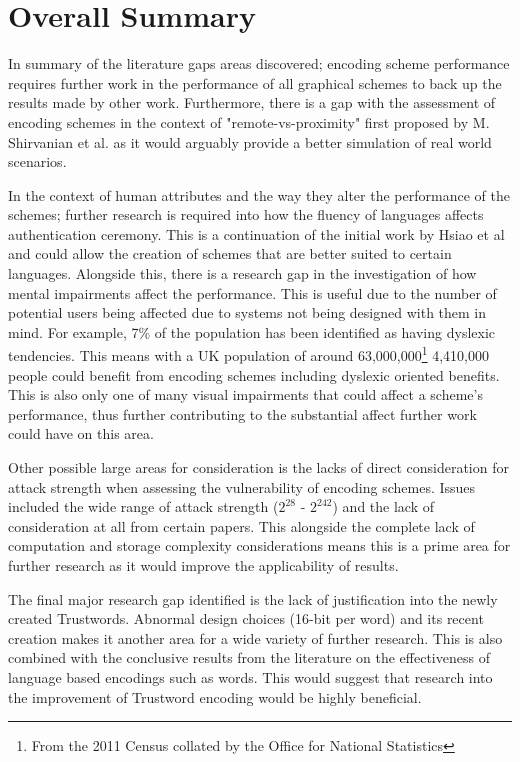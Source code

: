 \section{Overall Summary}
In summary of the literature gaps areas discovered; encoding scheme performance requires further work in the performance of all graphical schemes to back up the results made by other work. Furthermore, there is a gap with the assessment of encoding schemes in the context of "remote-vs-proximity" first proposed by M. Shirvanian et al. as it would arguably provide a better simulation of real world scenarios.

In the context of human attributes and the way they alter the performance of the schemes; further research is required into how the fluency of languages affects authentication ceremony. This is a continuation of the initial work by Hsiao et al and could allow the creation of schemes that are better suited to certain languages.
Alongside this, there is a research gap in the investigation of how mental impairments affect the performance. This is useful due to the number of potential users being affected due to systems not being designed with them in mind. For example, 7\% of the population has been identified as having dyslexic tendencies\cite{peterson2012developmental}. This means with a UK population of around 63,000,000\footnote{From the 2011 Census collated by the Office for National Statistics}  4,410,000 people could benefit from encoding schemes including dyslexic oriented benefits. This is also only one of many visual impairments that could affect a scheme's performance, thus further contributing to the substantial affect further work could have on this area.

Other possible large areas for consideration is the lacks of direct consideration for attack strength when assessing the vulnerability of encoding schemes. Issues included the wide range of attack strength ($2^{28}$ - $2^{242}$) and the lack of consideration at all from certain papers. This alongside the complete lack of computation and storage complexity considerations means this is a prime area for further research as it would improve the applicability of results.

The final major research gap identified is the lack of justification into the newly created \pep Trustwords. Abnormal design choices (16-bit per word) and its recent creation makes it another area for a wide variety of further research. This is also combined with the conclusive results from the literature on the effectiveness of language based encodings such as words. This would suggest that research into the improvement of Trustword encoding would be highly beneficial.